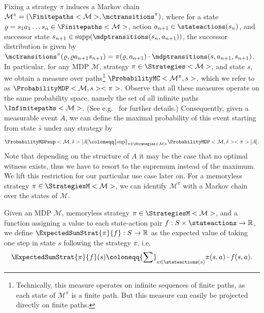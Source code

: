 \documentclass{article}
\newcommand{\Reals}{\mathbb{R}}
\newcommand{\MDP}{\mathcal{M}}
\newcommand{\States}{S}
\newcommand{\initialstate}{\hat{s}}
\newcommand{\finitepath}{\varrho}
\newcommand{\strategy}{\pi}
\DeclareMathOperator{\support}{supp}
\begin{document}
Fixing a strategy $\strategy$ induces a Markov chain $\MDP^\strategy = (\Finitepaths<\MDP>, \mctransitions^\strategy)$, where for a state $\finitepath = s_1 a_1 \dots s_n \in \Finitepaths<\MDP>$, action $a_{n+1} \in \stateactions(s_n)$, and successor state $s_{n+1} \in \support(\mdptransitions(s_n, a_{n+1}))$, the successor distribution is given by $\mctransitions^\strategy(\finitepath, \finitepath a_{n+1} s_{n+1}) = \strategy(\finitepath, a_{n+1}) \cdot \mdptransitions(s, a_{n+1}, s_{n+1})$.
In particular, for any MDP $\MDP$, strategy $\strategy \in \Strategies<\MDP>$, and state $s$, we obtain a measure over paths\footnote{Technically, this measure operates on infinite sequences of finite paths, as each state of $\MDP^\strategy$ is a finite path.
But this measure can easily be projected directly on finite paths.}
$\ProbabilityMC<\MDP^\strategy, s>$, which we refer to as $\ProbabilityMDP<\MDP, s><\strategy>$.
Observe that all these measures operate on the same probability space, namely the set of all infinite paths $\Infinitepaths<\MDP>$.
(See e.g.\ \cite[Section~2.1.6]{DBLP:books/wi/Puterman94} for further details.)
Consequently, given a measurable event $A$, we can define the maximal probability of this event starting from state $\initialstate$ under any strategy by
\begin{equation*}
	\ProbabilityMDPsup<\MDP, \initialstate>[A] \coloneqq {\sup}_{\strategy \in \Strategies<\MDP>} \ProbabilityMDP<\MDP, \initialstate><\strategy>[A].
\end{equation*}
Note that depending on the structure of $A$ it may be the case that no optimal witness exists, thus we have to resort to the supremum instead of the maximum.
We lift this restriction for our particular use case later on.
For a memoryless strategy $\strategy \in \StrategiesM<\MDP>$, we can identify $\MDP^\strategy$ with a Markov chain over the states of $\MDP$.

Given an MDP $\MDP$, memoryless strategy $\strategy \in \StrategiesM<\MDP>$, and a function assigning a value to each state-action pair $f : \States \times \stateactions \to \Reals$, we define $\ExpectedSumStrat{\strategy}{f} : \States \to \Reals$ as the expected value of taking one step in state $s$ following the strategy $\strategy$, i.e.
\begin{equation*}
	\ExpectedSumStrat{\strategy}{f}(s) \coloneqq {\sum}_{a \in \stateactions(s)} \strategy(s, a) \cdot f(s, a).
\end{equation*}
\end{document}
